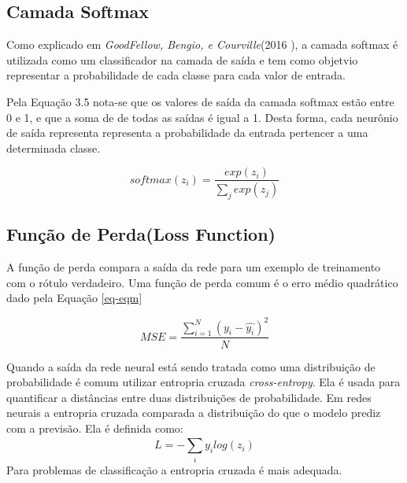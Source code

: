 \subsection{Camada Softmax}

Como explicado em \textit{GoodFellow, Bengio, e Courville}(2016 \cite{Goodfellow2016}), a camada softmax é utilizada como um classificador na camada de saída e tem como objetvio representar a probabilidade de cada classe para cada valor de entrada.

Pela Equação 3.5 nota-se que os valores de saída da camada softmax estão entre 0 e 1, e que a soma de de todas as saídas é igual a 1. Desta forma, cada neurônio de saída representa representa a probabilidade da entrada pertencer a uma determinada classe.

\begin{equation}
softmax(z_i) = \frac{exp(z_i)}{\sum_{j}^{} exp(z_j)}
\end{equation}

\subsection{Função de Perda(Loss Function)}
A função de perda compara a saída da rede para um exemplo de treinamento com o rótulo verdadeiro. Uma função de perda comum é o erro médio quadrático dado pela Equação \ref{eq-eqm}

\begin{equation} \label{eq-eqm}
MSE = 	\frac{ \sum_{i=1}^{N} (y_i - \hat{y_i})^2}{N}
\end{equation}

Quando a saída da rede neural está sendo tratada como uma distribuição de probabilidade é comum utilizar entropria cruzada \textit{cross-entropy}. Ela é usada para quantificar a distâncias entre duas distribuições de probabilidade. Em redes neurais a entropria cruzada comparada a distribuição do que o modelo prediz com a previsão. Ela é definida como:
\begin{equation}
L = - \sum_{i}^{} y_i log(z_i)
\end{equation}
Para problemas de classificação a entropria cruzada é mais adequada.


